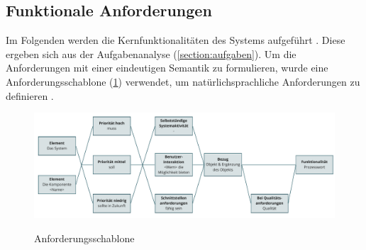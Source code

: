 \subsection*{Funktionale Anforderungen}
\label{section:funktionale}
Im Folgenden werden die Kernfunktionalitäten des Systems aufgeführt \cite{balzert2009}. Diese
ergeben sich aus der Aufgabenanalyse (\ref{section:aufgaben}). Um die Anforderungen mit einer
eindeutigen Semantik zu formulieren, wurde eine Anforderungsschablone (\ref{fig:schablone})
verwendet, um natürlichsprachliche Anforderungen zu definieren \cite{balzert2009}.

\begin{figure}[h]
        \centering
        \includegraphics[scale=0.45]{Bilder/anforderungsschablone.pdf}
        \label{fig:schablone}
        \caption[Anforderungsschablone]{Anforderungsschablone \cite{balzert2009}}
\end{figure}


